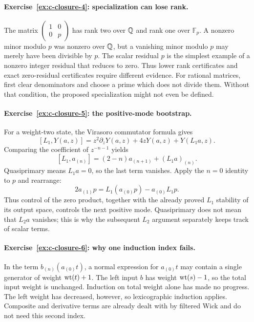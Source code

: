 \paragraph{Exercise~\ref{ex:c-closure-4}: specialization can lose rank.}
\label{sol:ex:c-closure-4}
The matrix $\left(\begin{smallmatrix}1&0\\0&p\end{smallmatrix}\right)$
has rank two over $\mathbb Q$ and rank one over $\mathbb F_p$.
A nonzero minor modulo $p$ was nonzero over $\mathbb Q$, but a vanishing
minor modulo $p$ may merely have been divisible by $p$. The scalar
residual $p$ is the simplest example of a nonzero integer residual
that reduces to zero. Thus lower rank certificates and exact
zero-residual certificates require different evidence.
For rational matrices, first clear denominators and choose a prime
which does not divide them. Without that condition, the proposed
specialization might not even be defined.



\paragraph{Exercise~\ref{ex:c-closure-5}: the positive-mode bootstrap.}
\label{sol:ex:c-closure-5}
For a weight-two state, the Virasoro commutator formula gives
\[
 [L_1,Y(a,z)]=z^2\partial_zY(a,z)+4zY(a,z)+Y(L_1a,z).
\]
Comparing the coefficient of $z^{-n-1}$ yields
\[
 [L_1,a_{(n)}]=(2-n)a_{(n+1)}+(L_1a)_{(n)}.
\]
Quasiprimary means $L_1a=0$, so the last term vanishes. Apply
the $n=0$ identity to $p$ and rearrange:
\[
 2a_{(1)}p=L_1(a_{(0)}p)-a_{(0)}L_1p.
\]
Thus control of the zero product, together with the already proved
$L_1$ stability of its output space, controls the next positive
mode. Quasiprimary does not mean that $L_2a$ vanishes; this is why
the subsequent $L_2$ argument separately keeps track of scalar terms.



\paragraph{Exercise~\ref{ex:c-closure-6}: why one induction index fails.}
\label{sol:ex:c-closure-6}
In the term $b_{(n)}(a_{(0)}t)$, a normal expression for
$a_{(0)}t$ may contain a single generator of weight $\operatorname{wt}(t)+1$.
The left input $b$ has weight $\operatorname{wt}(s)-1$, so the total input
weight is unchanged. Induction on total weight alone has made no
progress. The left weight has decreased, however, so lexicographic
induction applies. Composite and derivative terms are already dealt
with by filtered Wick and do not need this second index.


